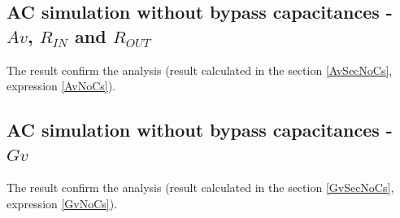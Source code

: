 \documentclass[10pt,a4paper]{book}
\begin{document}
\subsection{AC simulation without bypass capacitances - $Av$, $R_{IN}$ and $R_{OUT}$}

The result confirm the analysis (result calculated in the section \ref{AvSecNoCs}, expression \ref{AvNoCs}).


\subsection{AC simulation without bypass capacitances - $Gv$}

The result confirm the analysis (result calculated in the section \ref{GvSecNoCs}, expression \ref{GvNoCs}).

\end{document}
